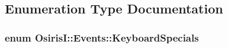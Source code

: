 \subsection{Enumeration Type Documentation}
\hypertarget{namespace_osiris_i_1_1_events_a9e0e697b7b35b97c94c7b6d758a117be}{
\subsubsection[{Keyboard\-Specials}]{\setlength{\rightskip}{0pt plus 5cm}enum {\bf Osiris\-I\-::\-Events\-::\-Keyboard\-Specials}\hspace{0.3cm}{\ttfamily [strong]}}}\label{namespace_osiris_i_1_1_events_a9e0e697b7b35b97c94c7b6d758a117be}
